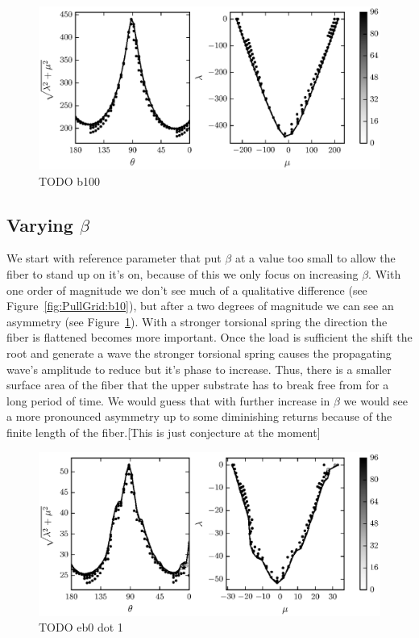 	\begin{figure}[t]
		\begin{center}
			\includegraphics{./fig/ch3/pull/b100/grid.eps}
		\end{center}		
		\caption{ TODO b100
		\label{fig:PullGrid:b100}}
	\end{figure}
	
\subsection{Varying $\beta$}

We start with reference parameter that put $\beta$ at a value too small to allow the fiber to stand up on it's on, because of this we only focus on increasing $\beta$. With one order of magnitude we don't see much of a qualitative difference (see Figure~\ref{fig:PullGrid:b10}), but after a two degrees of magnitude we can see an asymmetry (see Figure~\ref{fig:PullGrid:b100}). With a stronger torsional spring the direction the fiber is flattened becomes more important. Once the load is sufficient the shift the root and generate a wave the stronger torsional spring causes the propagating wave's amplitude to reduce but it's phase to increase. Thus, there is a smaller surface area of the fiber that the upper substrate has to break free from for a long period of time. We would guess that with further increase in $\beta$ we would see a more pronounced asymmetry up to some diminishing returns because of the finite length of the fiber.[This is just conjecture at the moment]

	\begin{figure}
		\begin{center}
			\includegraphics{./fig/ch3/pull/eb0.1/grid.eps}
		\end{center}		
		\caption{ TODO eb0 dot 1
		\label{fig:PullGrid:eb0.1}}
	\end{figure}

